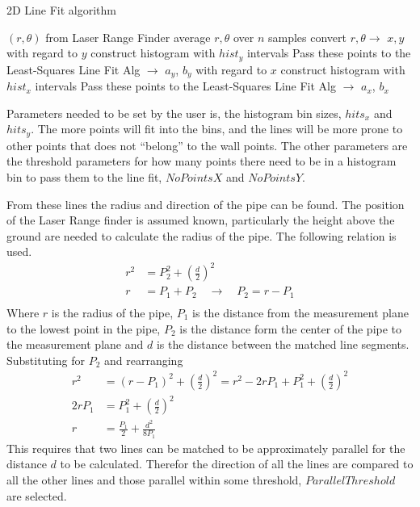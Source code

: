 \begin{algorithm}[htbp]
    \caption{2D Line Fit algorithm}
    \label{chap5:alg-2dlinefit}
    \begin{algorithmic}
        \REQUIRE $(r, \theta)$ from Laser Range Finder
        \STATE average $r, \theta$ over $n$ samples
        \STATE convert $r, \theta \rightarrow$ $x, y$ 
        \STATE with regard to $y$ construct histogram with $hist_y$ intervals
                \STATE Pass these points to the Least-Squares Line Fit Alg $\rightarrow$ $a_y$, $b_y$
            \ENDIF
        \ENDFOR
        \STATE with regard to $x$ construct histogram with $hist_x$ intervals
                \STATE Pass these points to the Least-Squares Line Fit Alg $\rightarrow$ $a_x$, $b_x$
            \ENDIF
        \ENDFOR
    \end{algorithmic}
\end{algorithm}
Parameters needed to be set by the user is, the histogram bin sizes, $hits_x$ and
$hits_y$. The more points will fit into the bins, and the lines will be more prone to
other points that does not ``belong'' to the wall points. The other parameters are the
threshold parameters for how many points there need to be in a histogram bin to pass them
to the line fit, $NoPointsX$ and $NoPointsY$.

From these lines the radius and direction of the pipe can be found. The position of the
Laser Range finder is assumed known, particularly the height above the ground are needed
to calculate the radius of the pipe. The following relation is used.
\begin{equation}
    \begin{aligned}
        r^2 &= P_2^2 + (\frac{d}{2})^2 \\
        r &= P_1 + P_2  \quad \rightarrow \quad P_2 = r - P_1\\
    \end{aligned}
\end{equation}
Where $r$ is the radius of the pipe, $P_1$ is the distance from the measurement plane to
the lowest point in the pipe, $P_2$ is the distance form the center of the pipe to the
measurement plane and $d$ is the distance between the matched line segments. Substituting
for $P_2$ and rearranging
\begin{equation}
    \begin{aligned}
        r^2& = (r - P_1)^2 + (\frac{d}{2})^2 = r^2 - 2 r P_1 + P_1^2 + (\frac{d}{2})^2 \\
        2 r P_1 &= P_1^2 + (\frac{d}{2})^2 \\
        r &= \frac{P_1}{2} + \frac{d^2}{8 P_1}
    \end{aligned}
\end{equation}
This requires that two lines can be matched to be approximately parallel for the distance
$d$ to be calculated. Therefor the direction of all the lines are compared to all the
other lines and those parallel within some threshold, $ParallelThreshold$ are selected.


